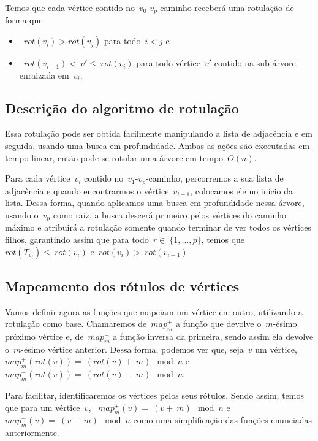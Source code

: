 \documentclass[a4paper,12pt]{article}
\begin{document}
	Temos que cada vértice contido no~$v_0$-$v_p$-caminho receberá 
	uma rotulação de forma que:
	\begin{itemize}
		\item~$rot(v_i)>rot(v_j)$ para todo~$i<j$ e
		\item~$rot(v_{i-1})<~v' \le~rot(v_i)$ para todo 
		vértice~$v'$ contido na sub-árvore enraizada em~$v_i$. 
	\end{itemize}

	\bigskip
	\bigskip

	\subsection{Descrição do algoritmo de rotulação}
	Essa rotulação pode ser obtida facilmente 
	manipulando a lista de adjacência e em seguida,
	usando uma busca em profundidade.
	Ambas as ações são executadas em tempo linear, então
	pode-se rotular uma árvore em tempo~$O(n)$.

	Para cada vértice~$v_i$ contido no~$v_1$-$v_{p}$-caminho, 
	percorremos a sua lista de adjacência e quando encontrarmos o 
	vértice~$v_{i-1}$, colocamos ele no início da lista.
	Dessa forma, quando aplicamos uma busca em profundidade nessa 
	árvore, usando o~$v_p$ como raiz, a busca descerá primeiro
	pelos vértices do caminho máximo e atribuirá a rotulação
	somente quando terminar de ver todos os vértices filhos, 
	garantindo assim que para todo~$r\in~\{1,\ldots, p\}$, temos 
	que~$rot(T_{v_i})\le~rot(v_i)$ e~$rot(v_i)>~rot(v_{i-1})$.
	
	\bigskip
	\bigskip

	\subsection{Mapeamento dos rótulos de vértices }
	Vamos definir agora as funções que mapeiam um vértice em 
	outro, utilizando a rotulação como base.
	Chamaremos de~$map^+_m$ a função que devolve o~$m$-ésimo 
	próximo vértice e, de~$map^-_m$ a função inversa da primeira, 
	sendo assim ela devolve o~$m$-ésimo vértice anterior.
	Dessa forma, podemos ver que, seja~$v$ um 
	vértice, ~$map^+_m(rot(v)) =~(rot(v)+~m)\mod n$ 
	e~$map^-_m(rot(v)) =~(rot(v)-~m)\mod n$.

	Para facilitar, identificaremos os vértices pelos seus 
	rótulos. 
	Sendo assim, temos que para um 
	vértice~$v$, ~$map^+_m(v) =~(v+~m)\mod n$ 
	e~$map^-_m(v) =~(v-~m)\mod n$ como uma simplificação das 
	funções enunciadas anteriormente.
\end{document}
